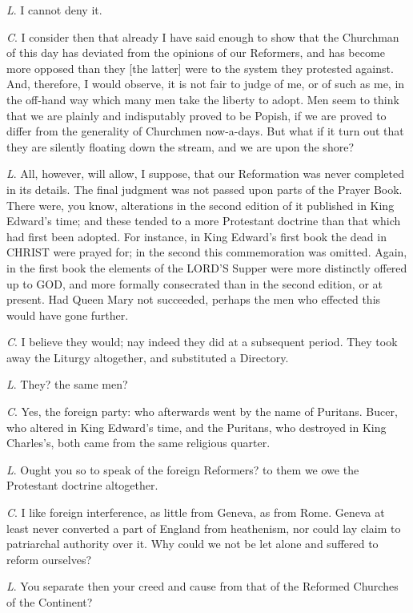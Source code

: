 \emph{L}. I cannot deny it.

\emph{C}. I consider then that already I have
said enough to show that the Churchman of this day has deviated from
the opinions of our Reformers, and has become more opposed than they
[the latter] were to the system they protested against. And,
therefore, I would observe, it is not fair to judge of me, or of such
as me, in the off-hand way which many men take the liberty to adopt.
Men seem to think that we are plainly and indisputably proved to be
Popish, if we are proved to differ from the generality of
Churchmen now-a-days. But what if it turn out that they are silently
floating down the stream, and we are upon the shore?

\emph{L}. All, however, will allow, I suppose,
that our Reformation was never completed in its details. The final
judgment was not passed upon parts of the Prayer Book. There were, you
know, alterations in the second edition of it published in King Edward's
time; and these tended to a more Protestant doctrine than that which
had first been adopted. For instance, in King Edward's first book the
dead in CHRIST were prayed for;
in the second this commemoration was omitted. Again, in the first book
the elements of the LORD'S
Supper were more distinctly offered up to GOD,
and more formally consecrated than in the second edition, or at
present. Had Queen Mary not succeeded, perhaps the men who effected
this would have gone further.

\emph{C}. I believe they would; nay indeed they
did at a subsequent period. They took away the Liturgy altogether, and
substituted a Directory.

\emph{L}. They? the same men?

\emph{C}. Yes, the foreign party: who afterwards
went by the name of Puritans. Bucer, who altered in King Edward's
time, and the Puritans, who destroyed in King Charles's, both came
from the same religious quarter.

\emph{L}. Ought you so to speak of the foreign
Reformers? to them we owe the Protestant doctrine altogether.

\emph{C}. I like foreign interference, as little
from Geneva, as from Rome. Geneva at least never converted a part of
England from heathenism, nor could lay claim to patriarchal authority
over it. Why could we not be let alone and suffered to reform
ourselves?

\emph{L}. You separate then your creed and cause
from that of the Reformed Churches of the Continent?

